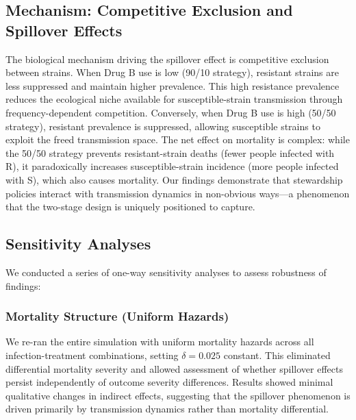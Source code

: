 \subsection{Mechanism: Competitive Exclusion and Spillover Effects}

The biological mechanism driving the spillover effect is competitive exclusion between strains.
When Drug B use is low (90/10 strategy), resistant strains are less suppressed and maintain higher
prevalence. This high resistance prevalence reduces the ecological niche available for susceptible-strain
transmission through frequency-dependent competition. Conversely, when Drug B use is high (50/50 strategy),
resistant prevalence is suppressed, allowing susceptible strains to exploit the freed transmission space.
The net effect on mortality is complex: while the 50/50 strategy prevents resistant-strain deaths
(fewer people infected with R), it paradoxically increases susceptible-strain incidence (more people
infected with S), which also causes mortality. Our findings demonstrate that stewardship policies
interact with transmission dynamics in non-obvious ways---a phenomenon that the two-stage design is
uniquely positioned to capture.



\subsection{Sensitivity Analyses}

We conducted a series of one-way sensitivity analyses to assess robustness of findings:

\subsubsection{Mortality Structure (Uniform Hazards)}
We re-ran the entire simulation with uniform mortality hazards across all infection-treatment combinations,
setting $\delta = 0.025$ constant. This eliminated differential mortality severity and allowed assessment
of whether spillover effects persist independently of outcome severity differences. Results showed minimal
qualitative changes in indirect effects, suggesting that the spillover phenomenon is driven primarily by
transmission dynamics rather than mortality differential.

